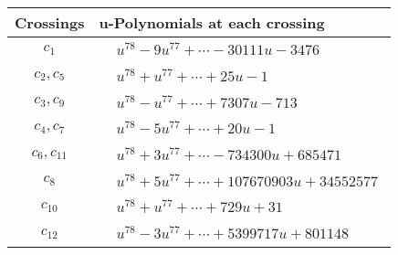 \documentclass[1p]{elsarticle_modified}
\theoremstyle{definition}
\begin{document}
\begin{tabular}{m{50pt}|m{274pt}}
Crossings & \hspace{64pt}u-Polynomials at each crossing \\
\hline $$\begin{aligned}c_{1}\end{aligned}$$&$\begin{aligned}
&u^{78}-9 u^{77}+\cdots-30111 u-3476
\end{aligned}$\\
\hline $$\begin{aligned}c_{2},c_{5}\end{aligned}$$&$\begin{aligned}
&u^{78}+u^{77}+\cdots+25 u-1
\end{aligned}$\\
\hline $$\begin{aligned}c_{3},c_{9}\end{aligned}$$&$\begin{aligned}
&u^{78}- u^{77}+\cdots+7307 u-713
\end{aligned}$\\
\hline $$\begin{aligned}c_{4},c_{7}\end{aligned}$$&$\begin{aligned}
&u^{78}-5 u^{77}+\cdots+20 u-1
\end{aligned}$\\
\hline $$\begin{aligned}c_{6},c_{11}\end{aligned}$$&$\begin{aligned}
&u^{78}+3 u^{77}+\cdots-734300 u+685471
\end{aligned}$\\
\hline $$\begin{aligned}c_{8}\end{aligned}$$&$\begin{aligned}
&u^{78}+5 u^{77}+\cdots+107670903 u+34552577
\end{aligned}$\\
\hline $$\begin{aligned}c_{10}\end{aligned}$$&$\begin{aligned}
&u^{78}+u^{77}+\cdots+729 u+31
\end{aligned}$\\
\hline $$\begin{aligned}c_{12}\end{aligned}$$&$\begin{aligned}
&u^{78}-3 u^{77}+\cdots+5399717 u+801148
\end{aligned}$\\
\hline
\end{tabular}\\~\\
\end{document}
